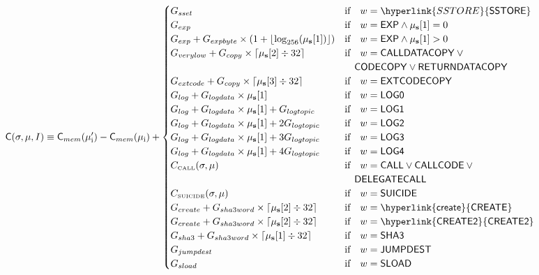 \begin{equation}\label{eq:gas_cost}
\cost(\st, \mst, I) \equiv \cost_{mem}(\mst'_{\mathrm{i}})-\cost_{mem}(\mst_{\mathrm{i}}) + \begin{cases}
G_{sset} & \text{if} \quad w = \hyperlink{SSTORE}{\op{SSTORE}} \\
G_{exp} & \text{if} \quad w = \op{EXP} \wedge \mst_{\mathbf{s}}[1] = 0 \\
G_{exp} + G_{expbyte}\times(1+\lfloor\log_{256}(\mst_{\mathbf{s}}[1])\rfloor) & \text{if} \quad w = \op{EXP} \wedge \mst_{\mathbf{s}}[1] > 0 \\
G_{verylow} + G_{copy}\times\lceil\mst_{\mathbf{s}}[2] \div 32\rceil & \text{if} \quad w = \op{CALLDATACOPY} \> \lor \\
&\quad \op{CODECOPY} \lor \op{RETURNDATACOPY} \\
G_{extcode} + G_{copy}\times\lceil\mst_{\mathbf{s}}[3] \div 32\rceil & \text{if} \quad w = \op{EXTCODECOPY} \\
G_{log}+G_{logdata}\times\mst_{\mathbf{s}}[1] & \text{if} \quad w = \op{LOG0} \\
G_{log}+G_{logdata}\times\mst_{\mathbf{s}}[1]+G_{logtopic} & \text{if} \quad w = \op{LOG1} \\
G_{log}+G_{logdata}\times\mst_{\mathbf{s}}[1]+2G_{logtopic} & \text{if} \quad w = \op{LOG2} \\
G_{log}+G_{logdata}\times\mst_{\mathbf{s}}[1]+3G_{logtopic} & \text{if} \quad w = \op{LOG3} \\
G_{log}+G_{logdata}\times\mst_{\mathbf{s}}[1]+4G_{logtopic} & \text{if} \quad w = \op{LOG4} \\
C_\text{\tiny CALL}(\st, \mst) & \text{if} \quad w = \op{CALL} \lor \op{CALLCODE} \> \lor \\
&\quad\op{DELEGATECALL} \\
C_\text{\tiny SUICIDE}(\st, \mst) & \text{if} \quad w = \op{SUICIDE} \\
G_{create}+G_{sha3word} \times \lceil \mst_{\mathbf{s}}[2] \div 32 \rceil & \text{if} \quad w = \op{\hyperlink{create}{CREATE}}\\
G_{create}+G_{sha3word} \times \lceil \mst_{\mathbf{s}}[2] \div 32 \rceil & \text{if} \quad w = \op{\hyperlink{CREATE2}{CREATE2}}\\
G_{sha3}+G_{sha3word} \times \lceil \mst_{\mathbf{s}}[1] \div 32 \rceil & \text{if} \quad w = \op{SHA3}\\
G_{jumpdest} & \text{if} \quad w = \op{JUMPDEST}\\
G_{sload} & \text{if} \quad w = \op{SLOAD}\\

\end{cases}
\end{equation}
